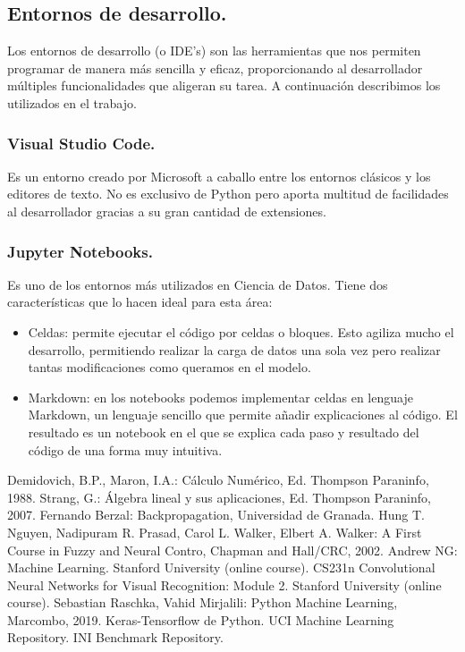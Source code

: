 \documentclass[a4paper,11pt]{article}
\begin{document}
\subsection{Entornos de desarrollo.}
Los entornos de desarrollo (o IDE's) son las herramientas que nos permiten programar de manera más sencilla y eficaz, proporcionando al desarrollador múltiples funcionalidades que aligeran su tarea. A continuación describimos los utilizados en el trabajo.
\subsubsection{Visual Studio Code.}
Es un entorno creado por Microsoft a caballo entre los entornos clásicos y los editores de texto. No es exclusivo de Python pero aporta multitud de facilidades al desarrollador gracias a su gran cantidad de extensiones.
\subsubsection{Jupyter Notebooks.}
Es uno de los entornos más utilizados en Ciencia de Datos. Tiene dos características que lo hacen ideal para esta área:
\begin{itemize}
\item  Celdas: permite ejecutar el código por celdas o bloques. Esto agiliza mucho el desarrollo, permitiendo realizar la carga de datos una sola vez pero realizar tantas modificaciones como queramos en el modelo.
\item Markdown: en los notebooks podemos implementar celdas en lenguaje Markdown, un lenguaje sencillo que permite añadir explicaciones al código. El resultado es un notebook en el que se explica cada paso y resultado del código de una forma muy intuitiva.
\end{itemize}

\newpage


\begin{thebibliography}{99}

 Demidovich, B.P., Maron, I.A.: Cálculo Numérico,  Ed. Thompson Paraninfo, 1988.
 Strang, G.: Álgebra lineal y sus aplicaciones, Ed. Thompson Paraninfo, 2007.
 Fernando Berzal: Backpropagation, Universidad de Granada.
 Hung T. Nguyen, Nadipuram R. Prasad, Carol L. Walker, Elbert A. Walker: A First Course in Fuzzy and Neural Contro, Chapman and Hall/CRC, 2002.
 Andrew NG: Machine Learning. Stanford University (online course).
 CS231n Convolutional Neural Networks for Visual Recognition: Module 2. Stanford University (online course).
 Sebastian Raschka, Vahid Mirjalili: Python Machine Learning, Marcombo, 2019.
 Keras-Tensorflow de Python.
 UCI Machine Learning Repository.
 INI Benchmark Repository.
\end{thebibliography}
\newpage
\end{document}
